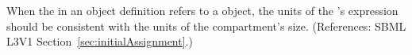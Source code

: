 When the  in an \InitialAssignment object definition refers
to a \Compartment object, the units of the \InitialAssignment's
 expression should be consistent with the units of the
compartment's size.  (References: SBML L3V1
Section~\ref{sec:initialAssignment}.)
